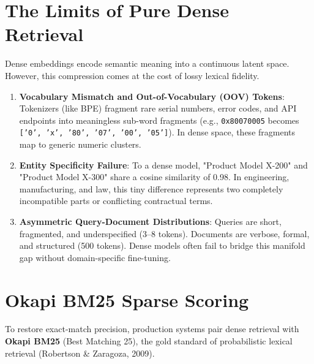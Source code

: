 \section{The Limits of Pure Dense Retrieval}

Dense embeddings encode semantic meaning into a continuous latent space. However, this compression comes at the cost of lossy lexical fidelity.

\begin{enumerate}[leftmargin=18pt]
  \item \textbf{Vocabulary Mismatch and Out-of-Vocabulary (OOV) Tokens}: Tokenizers (like BPE) fragment rare serial numbers, error codes, and API endpoints into meaningless sub-word fragments (e.g., \texttt{0x80070005} becomes \texttt{['0', 'x', '80', '07', '00', '05']}). In dense space, these fragments map to generic numeric clusters.
  \item \textbf{Entity Specificity Failure}: To a dense model, "Product Model X-200" and "Product Model X-300" share a cosine similarity of 0.98. In engineering, manufacturing, and law, this tiny difference represents two completely incompatible parts or conflicting contractual terms.
  \item \textbf{Asymmetric Query-Document Distributions}: Queries are short, fragmented, and underspecified (3--8 tokens). Documents are verbose, formal, and structured (500 tokens). Dense models often fail to bridge this manifold gap without domain-specific fine-tuning.
\end{enumerate}

\section{Okapi BM25 Sparse Scoring}

To restore exact-match precision, production systems pair dense retrieval with \textbf{Okapi BM25} (Best Matching 25), the gold standard of probabilistic lexical retrieval (Robertson \& Zaragoza, 2009).

